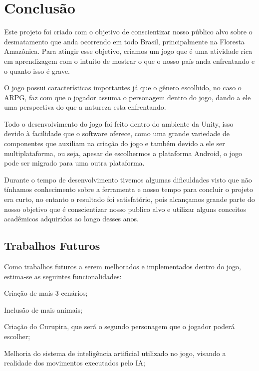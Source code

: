 \chapter{Conclusão}
\label{chap:conclusoes-e-trabalhos-futuros}

Este projeto foi criado com o objetivo de conscientizar nosso público alvo sobre o desmatamento que anda ocorrendo em todo Brasil, principalmente na Floresta Amazônica. Para atingir esse objetivo, criamos um jogo que é uma atividade rica em aprendizagem com o intuito de mostrar o que o nosso país anda enfrentando e o quanto isso é grave.

O jogo possui características importantes já que o gênero escolhido, no caso o ARPG, faz com que o jogador assuma o personagem dentro do jogo, dando a ele uma perspectiva do que a natureza esta enfrentando.

Todo o desenvolvimento do jogo foi feito dentro do ambiente da Unity, isso devido à facilidade que o software oferece, como uma grande variedade de componentes que auxiliam na criação do jogo e também devido a ele ser multiplataforma, ou seja, apesar de escolhermos a plataforma Android, o jogo pode ser migrado para uma outra plataforma.

Durante o tempo de desenvolvimento tivemos algumas dificuldades visto que não tínhamos conhecimento sobre a ferramenta e nosso tempo para concluir o projeto era curto, no entanto o resultado foi satisfatório, pois alcançamos grande parte do nosso objetivo que é conscientizar nosso publico alvo e utilizar alguns conceitos acadêmicos adquiridos ao longo desses anos.

\section{Trabalhos Futuros}
\label{sec:trabalhos-futuros}

Como trabalhos futuros a serem melhorados e implementados dentro do jogo, estima-se as seguintes funcionalidades:

\begin{alineascomponto}
	
   \item Criação de mais 3 cenários;
   \item Inclusão de mais animais;
   \item Criação do Curupira, que será o segundo personagem que o jogador poderá escolher;
   \item Melhoria do sistema de inteligência artificial utilizado no jogo, visando a realidade dos movimentos executados pelo IA;

	\end{alineascomponto}